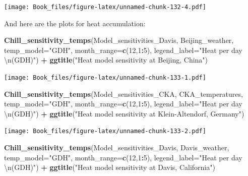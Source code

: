\documentclass[
]{book}
\newenvironment{Shaded}{\begin{snugshade}}{\end{snugshade}}
\newcommand{\CharTok}[1]{\textcolor[rgb]{0.31,0.60,0.02}{#1}}
\newcommand{\DataTypeTok}[1]{\textcolor[rgb]{0.13,0.29,0.53}{#1}}
\newcommand{\DecValTok}[1]{\textcolor[rgb]{0.00,0.00,0.81}{#1}}
\newcommand{\KeywordTok}[1]{\textcolor[rgb]{0.13,0.29,0.53}{\textbf{#1}}}
\newcommand{\NormalTok}[1]{#1}
\newcommand{\OperatorTok}[1]{\textcolor[rgb]{0.81,0.36,0.00}{\textbf{#1}}}
\newcommand{\StringTok}[1]{\textcolor[rgb]{0.31,0.60,0.02}{#1}}
\begin{document}
\texttt{[image: Book\_files/figure-latex/unnamed-chunk-132-4.pdf]}

And here are the plots for heat accumulation:

\begin{Shaded}
\begin{Highlighting}[]
\KeywordTok{Chill_sensitivity_temps}\NormalTok{(Model_sensitivities_Davis,}
\NormalTok{                        Beijing_weather,}
                        \DataTypeTok{temp_model=}\StringTok{"GDH"}\NormalTok{,}
                        \DataTypeTok{month_range=}\KeywordTok{c}\NormalTok{(}\DecValTok{12}\NormalTok{,}\DecValTok{1}\OperatorTok{:}\DecValTok{5}\NormalTok{),}
                        \DataTypeTok{legend_label=}\StringTok{"Heat per day }\CharTok{\textbackslash{}n}\StringTok{(GDH)"}\NormalTok{) }\OperatorTok{+}
\StringTok{  }\KeywordTok{ggtitle}\NormalTok{(}\StringTok{"Heat model sensitivity at Beijing, China"}\NormalTok{)}
\end{Highlighting}
\end{Shaded}

\texttt{[image: Book\_files/figure-latex/unnamed-chunk-133-1.pdf]}

\begin{Shaded}
\begin{Highlighting}[]
\KeywordTok{Chill_sensitivity_temps}\NormalTok{(Model_sensitivities_CKA,}
\NormalTok{                        CKA_temperatures,}
                        \DataTypeTok{temp_model=}\StringTok{"GDH"}\NormalTok{,}
                        \DataTypeTok{month_range=}\KeywordTok{c}\NormalTok{(}\DecValTok{12}\NormalTok{,}\DecValTok{1}\OperatorTok{:}\DecValTok{5}\NormalTok{),}
                        \DataTypeTok{legend_label=}\StringTok{"Heat per day }\CharTok{\textbackslash{}n}\StringTok{(GDH)"}\NormalTok{) }\OperatorTok{+}
\StringTok{  }\KeywordTok{ggtitle}\NormalTok{(}\StringTok{"Heat model sensitivity at Klein-Altendorf, Germany"}\NormalTok{)}
\end{Highlighting}
\end{Shaded}

\texttt{[image: Book\_files/figure-latex/unnamed-chunk-133-2.pdf]}

\begin{Shaded}
\begin{Highlighting}[]
\KeywordTok{Chill_sensitivity_temps}\NormalTok{(Model_sensitivities_Davis,}
\NormalTok{                        Davis_weather,}
                        \DataTypeTok{temp_model=}\StringTok{"GDH"}\NormalTok{,}
                        \DataTypeTok{month_range=}\KeywordTok{c}\NormalTok{(}\DecValTok{12}\NormalTok{,}\DecValTok{1}\OperatorTok{:}\DecValTok{5}\NormalTok{),}
                        \DataTypeTok{legend_label=}\StringTok{"Heat per day }\CharTok{\textbackslash{}n}\StringTok{(GDH)"}\NormalTok{) }\OperatorTok{+}
\StringTok{  }\KeywordTok{ggtitle}\NormalTok{(}\StringTok{"Heat model sensitivity at Davis, California"}\NormalTok{)}
\end{Highlighting}
\end{Shaded}
\end{document}
